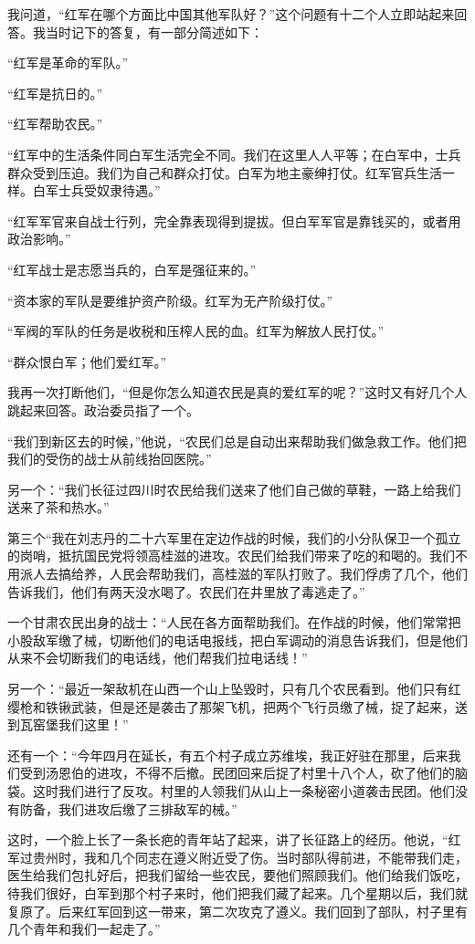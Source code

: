 \documentclass[10pt]{book}
\begin{document}
我问道，“红军在哪个方面比中国其他军队好？”这个问题有十二个人立即站起来回答。我当时记下的答复，有一部分简述如下：

“红军是革命的军队。”

“红军是抗日的。”

“红军帮助农民。”

“红军中的生活条件同白军生活完全不同。我们在这里人人平等；在白军中，士兵群众受到压迫。我们为自己和群众打仗。白军为地主豪绅打仗。红军官兵生活一样。白军士兵受奴隶待遇。”

“红军军官来自战士行列，完全靠表现得到提拔。但白军军官是靠钱买的，或者用政治影响。”

“红军战士是志愿当兵的，白军是强征来的。”

“资本家的军队是要维护资产阶级。红军为无产阶级打仗。”

“军阀的军队的任务是收税和压榨人民的血。红军为解放人民打仗。”

“群众恨白军；他们爱红军。”

我再一次打断他们，“但是你怎么知道农民是真的爱红军的呢？”这时又有好几个人跳起来回答。政治委员指了一个。

“我们到新区去的时候，”他说，“农民们总是自动出来帮助我们做急救工作。他们把我们的受伤的战士从前线抬回医院。”

另一个：“我们长征过四川时农民给我们送来了他们自己做的草鞋，一路上给我们送来了茶和热水。”

第三个“我在刘志丹的二十六军里在定边作战的时候，我们的小分队保卫一个孤立的岗哨，抵抗国民党将领高桂滋的进攻。农民们给我们带来了吃的和喝的。我们不用派人去搞给养，人民会帮助我们，高桂滋的军队打败了。我们俘虏了几个，他们告诉我们，他们有两天没水喝了。农民们在井里放了毒逃走了。”

一个甘肃农民出身的战士：“人民在各方面帮助我们。在作战的时候，他们常常把小股敌军缴了械，切断他们的电话电报线，把白军调动的消息告诉我们，但是他们从来不会切断我们的电话线，他们帮我们拉电话线！”

另一个：“最近一架敌机在山西一个山上坠毁时，只有几个农民看到。他们只有红缨枪和铁锹武装，但是还是袭击了那架飞机，把两个飞行员缴了械，捉了起来，送到瓦窑堡我们这里！”

还有一个：“今年四月在延长，有五个村子成立苏维埃，我正好驻在那里，后来我们受到汤恩伯的进攻，不得不后撤。民团回来后捉了村里十八个人，砍了他们的脑袋。这时我们进行了反攻。村里的人领我们从山上一条秘密小道袭击民团。他们没有防备，我们进攻后缴了三排敌军的械。”

这时，一个脸上长了一条长疤的青年站了起来，讲了长征路上的经历。他说，“红军过贵州时，我和几个同志在遵义附近受了伤。当时部队得前进，不能带我们走，医生给我们包扎好后，把我们留给一些农民，要他们照顾我们。他们给我们饭吃，待我们很好，白军到那个村子来时，他们把我们藏了起来。几个星期以后，我们就复原了。后来红军回到这一带来，第二次攻克了遵义。我们回到了部队，村子里有几个青年和我们一起走了。”
\end{document}
